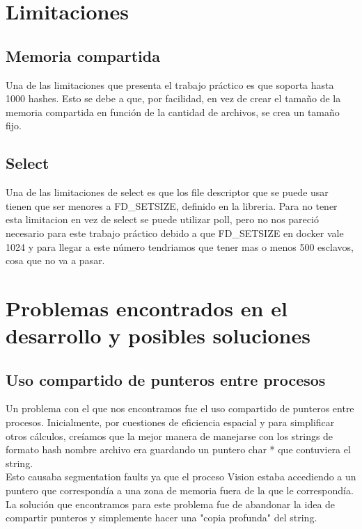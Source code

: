 \documentclass[12pt]{article}
\begin{document}
	
\section{Limitaciones}

\subsection{Memoria compartida}
    Una de las limitaciones que presenta el trabajo pr\'actico es que soporta hasta 1000 hashes. Esto se debe a que, por facilidad, en vez de crear el tamaño de la memoria compartida en funci\'on de la cantidad de archivos, se crea un tamaño fijo.
\subsection{Select}
    Una de las limitaciones de select es que los file descriptor  que se puede usar tienen que ser menores a FD\_SETSIZE, definido en la libreria. Para no tener esta limitacion en vez de select se puede utilizar poll, pero no nos pareci\'o necesario para este trabajo pr\'actico debido a que FD\_SETSIZE en docker vale 1024 y para llegar a este n\'umero tendriamos que tener mas o menos 500 esclavos, cosa que no va a pasar.
    
\section{Problemas encontrados en el desarrollo y posibles soluciones}

\subsection{Uso compartido de punteros entre procesos}
Un problema con el que nos encontramos fue el uso compartido de punteros entre procesos. Inicialmente, por cuestiones de eficiencia espacial y para simplificar otros c\'alculos, cre\'iamos que la mejor manera de manejarse con los strings de formato hash nombre archivo era guardando un puntero char * que contuviera el string.\\

Esto causaba segmentation faults ya que el proceso Vision estaba accediendo a un puntero que correspond\'ia a una zona de memoria fuera de la que le correspond\'ia.\\

La soluci\'on que encontramos para este problema fue de abandonar la idea de compartir punteros y simplemente hacer una "copia profunda" del string.
\end{document}
